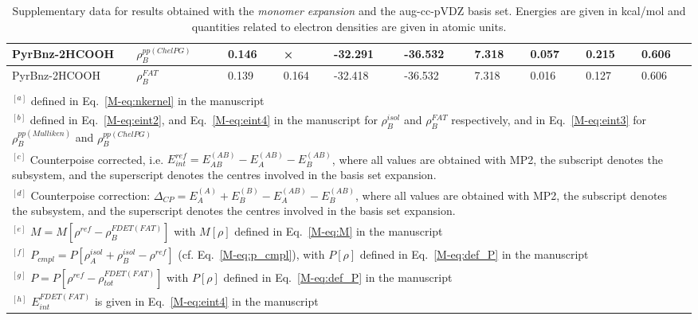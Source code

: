\documentclass[amsmath,amssymb,preprint,aip,jcp]{revtex4-1}
\begin{document}
\begin{table}[H]
\begin{center}
{\begin{tabular}{|l|l|l|l|l|l|l|l|l|l|}
PyrBnz-2HCOOH & $\rho_B^{pp(ChelPG)}$ & 0.146 & × & -32.291 & -36.532 & 7.318 & 0.057 & 0.215 & 0.606\\\hline
PyrBnz-2HCOOH & $\rho_B^{FAT}$ & 0.139 & 0.164 & -32.418 & -36.532 & 7.318 & 0.016 & 0.127 & 0.606\\\hline
\multicolumn{10}{c}{ } \\
\multicolumn{10}{p{1.0\textwidth}}{$^{[a]}$ defined in Eq.~\ref{M-eq:nkernel} in the manuscript}\\
\multicolumn{10}{p{1.0\textwidth}}{$^{[b]}$ defined in Eq.~\ref{M-eq:eint2}, and Eq.~\ref{M-eq:eint4} in the manuscript for $\rho_B^{isol}$ and $\rho_B^{FAT }$ respectively, and in Eq.~\ref{M-eq:eint3} for $\rho_B^{pp(Mulliken)}$ and $\rho_B^{pp(ChelPG)}$}\\
\multicolumn{10}{p{1.0\textwidth}}{$^{[c]}$ Counterpoise corrected, i.e. $E_{int}^{ref} = E_{AB}^{(AB)} - E_{A}^{(AB)} - E_{B}^{(AB)}$, where all values are obtained with MP2, the subscript denotes the subsystem, and the superscript denotes the centres involved in the basis set expansion.} \\
\multicolumn{10}{p{1.0\textwidth}}{$^{[d]}$ Counterpoise correction: $\Delta_{CP} = E_{A}^{(A)} + E_{B}^{(B)} - E_{A}^{(AB)} - E_{B}^{(AB)}$, where all values are obtained with MP2, the subscript denotes the subsystem, and the superscript denotes the centres involved in the basis set expansion.} \\
\multicolumn{10}{p{1.0\textwidth}}{$^{[e]}$ $M=M[\rho^{ref} - \rho^{FDET(FAT)}_{B}]$ with $M[\rho]$ defined in Eq.~\ref{M-eq:M} in the manuscript}\\
\multicolumn{10}{p{1.0\textwidth}}{$^{[f]}$ $P_{cmpl}=P[\rho_A^{isol}+\rho_B^{isol} - \rho^{ref}]$ (cf. Eq.~\ref{M-eq:p_cmpl}), with $P[\rho]$ defined in Eq.~\ref{M-eq:def_P} in the manuscript}\\
\multicolumn{10}{p{1.0\textwidth}}{$^{[g]}$ $P=P[\rho^{ref} - \rho_{tot}^{FDET(FAT)}]$ with $P[\rho]$ defined in Eq.~\ref{M-eq:def_P} in the manuscript}\\
\multicolumn{10}{p{1.0\textwidth}}{$^{[h]}$ $E^{FDET(FAT)}_{int}$ is given in Eq.~\ref{M-eq:eint4} in the manuscript}\\
\end{tabular}
}
\end{center}
\caption{Supplementary data for results obtained with the \textit{monomer expansion} and the aug-cc-pVDZ basis set. Energies are given in kcal/mol and quantities related to electron densities are given in atomic units.}
\end{table}
\end{document}
